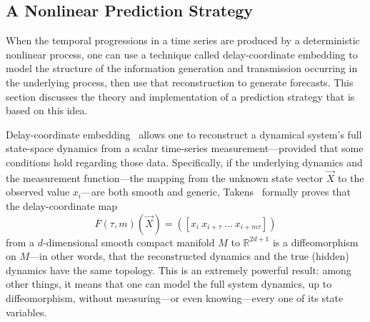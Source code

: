 \subsection{A Nonlinear Prediction Strategy}
\label{sec:lma}

When the temporal progressions in a time series are produced by a
deterministic nonlinear process, one can use a technique called
delay-coordinate embedding
%
%
to model the structure of the information generation and transmission
occurring in the underlying process, then use that reconstruction to
generate forecasts.  This section discusses the theory and
implementation of a prediction strategy that is based on this idea.

Delay-coordinate embedding~\cite{packard80,Sauer:1991lr,Takens:1981uq}
allows one to reconstruct a dynamical system's full state-space
dynamics from a scalar time-series measurement---provided that some
conditions hold regarding those data.  Specifically, if the underlying
dynamics and the measurement function---the mapping from the unknown
state vector $\vec{X}$ to the observed value $x_i$---are both smooth
and generic, Takens~\cite{Takens:1981uq} formally proves that the
delay-coordinate map
\[
F(\tau,m)(\vec{X}) = ([x_{i} ~ x_{i+\tau} ~ \dots ~x_{i+m\tau}])
\]
from a $d$-dimensional smooth compact manifold $M$ to
$\mathbb{R}^{2d+1}$ is a diffeomorphism on $M$---in other words, that
the reconstructed dynamics and the true (hidden) dynamics have the
same topology.  This is an extremely powerful result: among other
things, it means that one can model the full system dynamics, up to
diffeomorphism, without measuring---or even knowing---every one of its
state variables.

